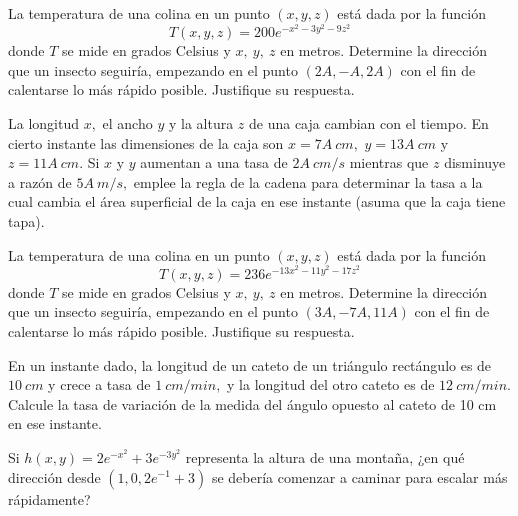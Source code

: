 \begin{prob}
La temperatura de una colina en un punto $(x,y,z)$ está dada por la función $$T(x,y,z)=200e^{-x^2-3y^2-9z^2}$$ donde $T$ se mide en grados Celsius y $x,\ y, \ z$ en metros.  Determine la dirección que un insecto seguiría, empezando en el punto $(2A,-A,2A)$ con el fin de calentarse lo más rápido posible. Justifique su respuesta.
\end{prob}

\begin{prob}
La longitud $x,$ el ancho $y$ y la altura $z$ de una caja cambian con el tiempo. En cierto instante las dimensiones de la caja son $x=7A\ cm,$ $y=13A\ cm$ y $z= 11A\ cm.$ Si $x$ y $y$ aumentan a una tasa de $2A\ cm/s$ mientras que $z$ disminuye a razón de $5A\ m/s,$ emplee la regla de la cadena para determinar la tasa a la cual cambia el área superficial de la caja en ese instante (asuma que la caja tiene tapa).
\end{prob}

\begin{prob}
La temperatura de una colina en un punto $(x,y,z)$ está dada por la función $$T(x,y,z)=236e^{-13x^2-11y^2-17z^2}$$ donde $T$ se mide en grados Celsius y $x,\ y, \ z$ en metros.  Determine la dirección que un insecto seguiría, empezando en el punto $(3A,-7A,11A)$ con el fin de calentarse lo más rápido posible. Justifique su respuesta.
\end{prob}

\begin{prob}
En un instante dado, la longitud de un cateto de un triángulo rectángulo es de $10\ cm$ y crece a tasa de $1\ cm/min,$ y la longitud del otro cateto es de $12\ cm/min.$ Calcule la tasa de variación de la medida del ángulo opuesto al cateto de 10 cm en ese instante.
\end{prob}

\begin{prob}
Si $h(x,y)=2e^{-x^2}+3e^{-3y^2}$ representa la altura de una montaña, ¿en qué dirección desde $(1,0,2e^{-1}+3)$ se debería comenzar a caminar para escalar más rápidamente?
\end{prob}

